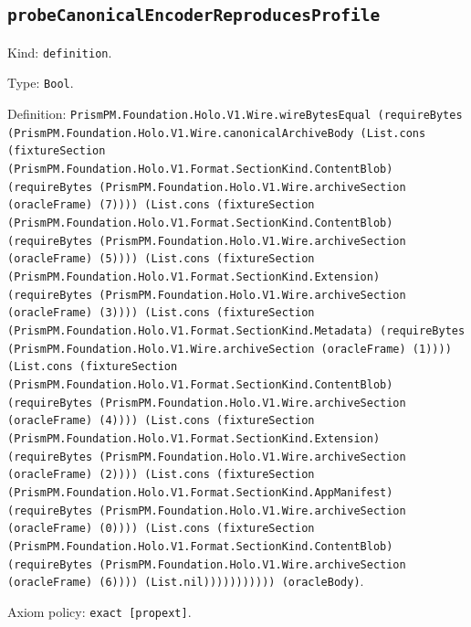 \documentclass[11pt]{article}
\begin{document}
\subsection*{\texttt{probeCanonicalEncoderReproducesProfile}}
\noindent Kind: \texttt{definition}.\par
\noindent Type: \texttt{Bool}.\par
\noindent Definition: \texttt{PrismPM.Foundation.Holo.V1.Wire.wireBytesEqual (requireBytes (PrismPM.Foundation.Holo.V1.Wire.canonicalArchiveBody (List.cons (fixtureSection (PrismPM.Foundation.Holo.V1.Format.SectionKind.ContentBlob) (requireBytes (PrismPM.Foundation.Holo.V1.Wire.archiveSection (oracleFrame) (7)))) (List.cons (fixtureSection (PrismPM.Foundation.Holo.V1.Format.SectionKind.ContentBlob) (requireBytes (PrismPM.Foundation.Holo.V1.Wire.archiveSection (oracleFrame) (5)))) (List.cons (fixtureSection (PrismPM.Foundation.Holo.V1.Format.SectionKind.Extension) (requireBytes (PrismPM.Foundation.Holo.V1.Wire.archiveSection (oracleFrame) (3)))) (List.cons (fixtureSection (PrismPM.Foundation.Holo.V1.Format.SectionKind.Metadata) (requireBytes (PrismPM.Foundation.Holo.V1.Wire.archiveSection (oracleFrame) (1)))) (List.cons (fixtureSection (PrismPM.Foundation.Holo.V1.Format.SectionKind.ContentBlob) (requireBytes (PrismPM.Foundation.Holo.V1.Wire.archiveSection (oracleFrame) (4)))) (List.cons (fixtureSection (PrismPM.Foundation.Holo.V1.Format.SectionKind.Extension) (requireBytes (PrismPM.Foundation.Holo.V1.Wire.archiveSection (oracleFrame) (2)))) (List.cons (fixtureSection (PrismPM.Foundation.Holo.V1.Format.SectionKind.AppManifest) (requireBytes (PrismPM.Foundation.Holo.V1.Wire.archiveSection (oracleFrame) (0)))) (List.cons (fixtureSection (PrismPM.Foundation.Holo.V1.Format.SectionKind.ContentBlob) (requireBytes (PrismPM.Foundation.Holo.V1.Wire.archiveSection (oracleFrame) (6)))) (List.nil))))))))))) (oracleBody)}.\par
\noindent Axiom policy: \texttt{exact [propext]}.\par
\end{document}
